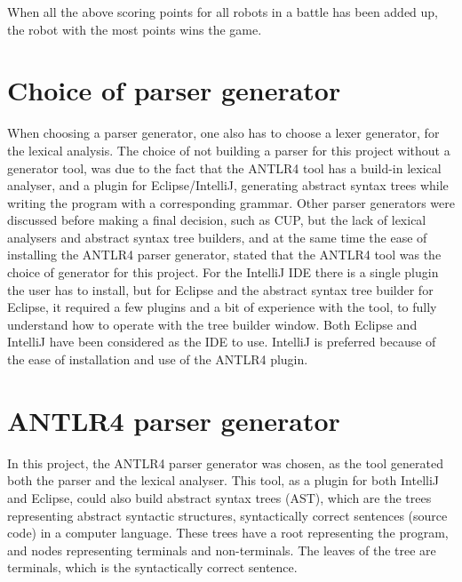 When all the above scoring points for all robots in a battle has been added up, the robot with the most points wins the game.

\section{Choice of parser generator}
\label{sec:ParserGenerator}
When choosing a parser generator, one also has to choose a lexer generator, for the lexical analysis. The choice of not building a parser for this project without a generator tool, was due to the fact that the ANTLR4 tool has a build-in lexical analyser, and a plugin for Eclipse/IntelliJ, generating abstract syntax trees while writing the program with a corresponding grammar. Other parser generators were discussed before making a final decision, such as CUP, but the lack of lexical analysers and abstract syntax tree builders, and at the same time the ease of installing the ANTLR4 parser generator, stated that the ANTLR4 tool was the choice of generator for this project. For the IntelliJ IDE there is a single plugin the user has to install, but for Eclipse and the abstract syntax tree builder for Eclipse, it required a few plugins and a bit of experience with the tool, to fully understand how to operate with the tree builder window. Both Eclipse and IntelliJ have been considered as the IDE to use. IntelliJ is preferred because of the ease of installation and use of the ANTLR4 plugin.
 
\section{ANTLR4 parser generator}
\label{Antlr}
In this project, the ANTLR4 parser generator was chosen, as the tool generated both the parser and the lexical analyser. This tool, as a plugin for both IntelliJ and Eclipse, could also build abstract syntax trees (AST), which are the trees representing abstract syntactic structures, syntactically correct sentences (source code) in a computer language. These trees have a root representing the program, and nodes representing terminals and non-terminals. The leaves of the tree are terminals, which is the syntactically correct sentence.

